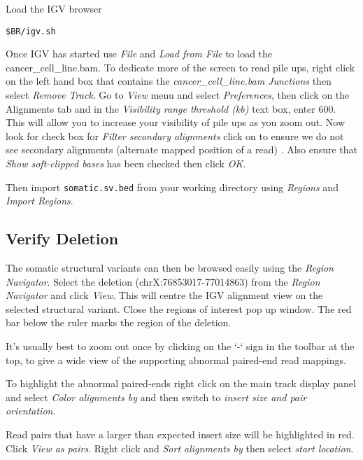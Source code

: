 \begin{steps}
Load the IGV browser 
\begin{lstlisting}
$BR/igv.sh
\end{lstlisting}
\end{steps}

\begin{information}
Once IGV has started use \emph{File} and \emph{Load from File} to load the cancer\_cell\_line.bam. To dedicate more of the screen to read pile ups, right click on the left hand box that contains the \emph{cancer\_cell\_line.bam Junctions} then select \emph{Remove Track}. Go to \emph{View} menu and select \emph{Preferences}, then click on the Alignments tab and in the \emph{Visibility range threshold (kb)} text box, enter 600. This will allow you to increase your visibility of pile ups as you zoom out. Now look for check box for \emph{Filter secondary alignments} click on to ensure we do not see secondary alignments (alternate mapped position of a read) . Also ensure that \emph{Show soft-clipped bases} has been checked then click \emph{OK}.
 
Then import \texttt{somatic.sv.bed} from your working directory using \emph{Regions} and \emph{Import Regions}. 

\end{information}

\subsection{Verify Deletion}
\begin{advanced}

\begin{steps}
The somatic structural variants can then be browsed easily using the \emph{Region Navigator}.  Select the deletion (chrX:76853017-77014863) from the \emph{Region Navigator} and click \emph{View}. This will centre the IGV alignment view on the selected structural variant. Close the regions of interest pop up window. The red bar below the ruler marks the region of the deletion.

It’s usually best to zoom out once by clicking on the ‘-‘ sign in the toolbar at the top, to give a wide view of the supporting abnormal paired-end read mappings. 

To highlight the abnormal paired-ends right click on the main track display panel and select \emph{Color alignments by} and then switch to \emph{insert size and pair orientation}.

Read pairs that have a larger than expected insert size will be highlighted in red. Click \emph{View as pairs}. Right click and \emph{Sort alignments by} then select \emph{start location}.

\end{steps}
\end{advanced}

